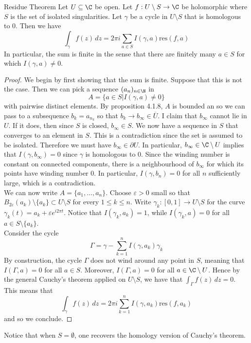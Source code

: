 \documentclass[a4paper]{article}
\begin{document}
\begin{thm}{Residue Theorem}{} Let $U\subseteq\C$ be open. Let $f:U\setminus S\to\C$ be holomorphic where $S$ is the set of isolated singularities. Let $\gamma$ be a cycle in $U\setminus S$ that is homologous to $0$. Then we have $$\int_\gamma f(z)\,dz=2\pi i\sum_{a\in S}I(\gamma,a)\text{res}(f,a)$$ In particular, the sum is finite in the sense that there are finitely many $a\in S$ for which $I(\gamma,a)\neq 0$. 
\begin{proof} 
We begin by first showing that the sum is finite. Suppose that this is not the case. Then we can pick a sequence $(a_n)_{n\in\N}$ in $$A=\{a\in S|I(\gamma,a)\neq 0\}$$ with pairwise distinct elements. By proposition 4.1.8, $A$ is bounded an so we can pass to a subsequence $b_k=a_{n_k}$ so that $b_k\to b_\infty\in\overline{U}$. I claim that $b_\infty$ cannot lie in $U$. If it does, then since $S$ is closed, $b_\infty\in S$. We now have a sequence in $S$ that converges to an element in $S$. This is a contradiction since the set is assumed to be isolated. Therefore we must have $b_\infty\in\partial U$. In particular, $b_\infty\in\C\setminus U$ implies that $I(\gamma, b_\infty)=0$ since $\gamma$ is homologous to $0$. Since the winding number is constant on connected components, there is a neighbourhood of $b_\infty$ for which its points have winding number $0$. In particular, $I(\gamma, b_n)=0$ for all $n$ sufficiently large, which is a contradiction. \\

We can now write $A=\{a_1,\dots,a_n\}$. Choose $\varepsilon>0$ small so that $B_{2\varepsilon}(a_k)\setminus\{a_k\}\subset U\setminus S$ for every $1\leq k\leq n$. Write $\gamma_k:[0,1]\to U\setminus S$ for the curve $\gamma_k(t)=a_k+\varepsilon e^{i2\pi t}$. Notice that $I(\gamma_k,a_k)=1$, while $I(\gamma_k,a)=0$ for all $a\in S\setminus\{a_k\}$. \\

Consider the cycle $$\Gamma=\gamma-\sum_{k=1}^nI(\gamma,a_k)\gamma_k$$ By construction, the cycle $\Gamma$ does not wind around any point in $S$, meaning that $I(\Gamma,a)=0$ for all $a\in S$. Moreover, $I(\Gamma,a)=0$ for all $a\in\C\setminus U$. Hence by the general Cauchy's theorem applied on $U\setminus S$, we have that $\int_\Gamma f(z)\,dz=0$. This means that $$\int_\gamma f(z)\,dz=2\pi i\sum_{k=1}^nI(\gamma,a_k)\text{res}(f,a_k)$$ and so we conclude. 
\end{proof}
\end{thm}

Notice that when $S=\emptyset$, one recovers the homology version of Cauchy's theorem. 
\end{document}
